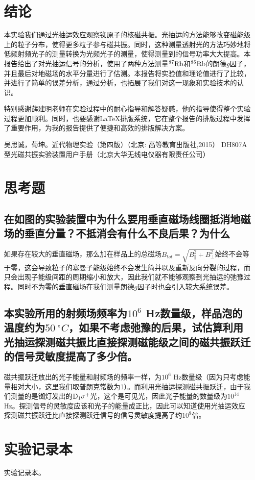 \documentclass[font=default]{mpltx}
\begin{document}
\section{结论}
本实验我们通过光抽运效应观察铷原子的核磁共振。光抽运的方法能够改变磁能级上的粒子分布，使得更多粒子参与磁共振。同时，这种测量透射光的方法巧妙地将低频射频光子的测量转换为光频光子的测量，使得测量到的信号功率大大提高。本报告给出了对光抽运信号的分析，使用了两种方法测量${\rm ^{87}Rb}$和${\rm ^{85}Rb}$的朗德$g$因子，并且最后对地磁场的水平分量进行了估测。本报告将实验值和理论值进行了比较，并进行了简单的误差分析，通过分析，也拓展了我们对这一现象和实验技术的认识。
\begin{acknowledgments}
  特别感谢薛建明老师在实验过程中的耐心指导和解答疑惑，他的指导使得整个实验过程更加顺利。同时，也要感谢\LaTeX 排版系统，它在整个报告的排版过程中发挥了重要作用，为我的报告提供了便捷和高效的排版解决方案。
\end{acknowledgments}


\begin{thebibliography}{}

   吴思诚，荀坤。近代物理实验（第四版）（北京: 高等教育出版社,2015）
   DH807A型光磁共振实验装置用户手册（北京大华无线电仪器有限责任公司）
\end{thebibliography}
  
\clearpage %
\appendix %
\section{思考题}
\subsection{在如图的实验装置中为什么要用垂直磁场线圈抵消地磁场的垂直分量？不抵消会有什么不良后果？为什么}
如果存在较大的垂直磁场，那么加在样品上的总磁场$B_{tot}=\sqrt{B_\parallel^2+B_\perp^2}$始终不会等于零，这会导致粒子的塞曼子能级始终不会发生简并以及重新反向分裂的过程，而只会出现子能级间距的周期缩小和放大，因此我们就不能够观察到光抽运的弛豫过程。同时不为零的垂直磁场在我们测量朗德$g$因子时也会引入较大系统误差。
\subsection{本实验所用的射频场频率为$10^6$ Hz数量级，样品泡的温度约为$50\ {^\circ C}$，如果不考虑弛豫的后果，试估算利用光抽运探测磁共振比直接探测磁能级之间的磁共振跃迁的信号灵敏度提高了多少倍。}
磁共振跃迁放出的光子能量和射频场的频率一样，为$10^6$ Hz数量级（因为只考虑能量相对大小，这里我们取普朗克常数为1）。而利用光抽运探测磁共振跃迁，由于我们测量的是铷灯发出的${\rm D_1\sigma^+}$光，这个是可见光，因此光子能量的数量级为$10^14$ Hz。探测信号的灵敏度应该和光子的能量成正比，因此可以知道使用光抽运效应探测磁共振跃迁比直接探测跃迁信号的信号灵敏度提高了约$10^8$倍。

\section{实验记录本}
实验记录本。
\end{document}
